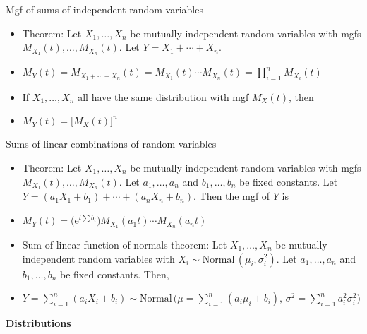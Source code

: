 \documentclass{article}
\newcommand{\bu}[1]{\textbf{\ul{#1}}}				%
\newcommand{\e}{\mathrm{e}}		%
\newcommand{\follow}[1]{\sim \text{#1}\,}		%
\newcommand{\vecn}[2]{#1_1, \ldots, #1_{#2}}	%
\begin{document}
Mgf of sums of independent random variables
\begin{itemize}
    \item Theorem: Let $\vecn{X}{n}$ be mutually independent random variables with mgfs $M_{X_1}(t), \ldots, M_{X_n}(t)$. Let $Y = X_1 + \cdots + X_n$.
    \item[] $\displaystyle M_Y(t) = M_{X_1 + \cdots + X_n}(t) = M_{X_1}(t) \cdots M_{X_n}(t) = \prod_{i = 1}^n M_{X_i}(t)$
    \item[] If $\vecn{X}{n}$ all have the same distribution with mgf $M_X(t)$, then
    \item[] $M_Y(t) = \big[M_X(t)\big]^n$
\end{itemize}\bigskip

Sums of linear combinations of random variables
\begin{itemize}
     \item Theorem: Let $\vecn{X}{n}$ be mutually independent random variables with mgfs $M_{X_1}(t), \ldots, M_{X_n}(t)$. Let $\vecn{a}{n}$ and $\vecn{b}{n}$ be fixed constants. Let $Y = (a_1 X_1 + b_1) + \cdots + (a_n X_n + b_n)$. Then the mgf of $Y$ is
     \item[] $M_Y(t) = \big(\e^{t \sum b_i}\big) M_{X_1}(a_1 t) \cdots M_{X_n}(a_n t)$
     \item Sum of linear function of normals theorem: Let $\vecn{X}{n}$ be mutually independent random variables with $X_i \follow{Normal}(\mu_i, \sigma_i^2)$. Let $\vecn{a}{n}$ and $\vecn{b}{n}$ be fixed constants. Then,
     \item[] $\displaystyle Y =\sum_{i = 1}^n (a_i X_i + b_i) \follow{Normal}\bigg(\mu = \sum_{i = 1}^n (a_i \mu_i + b_i), \, \sigma^2 = \sum_{i = 1}^n a_i^2 \sigma_i^2\bigg)$
\end{itemize}
     
\newpage

{\large \bu{Distributions}}\bigskip
\end{document}
